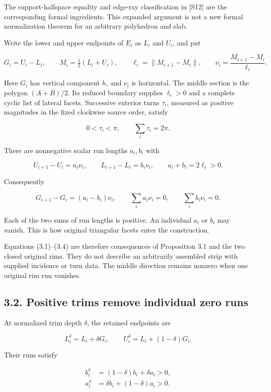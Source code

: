 \documentclass[
  11pt,
  letterpaper,
]{article}
\begin{document}
The support-halfspace equality and edge-ray classification in {[}S12{]}
are the corresponding formal ingredients. This expanded argument is not
a new formal normalization theorem for an arbitrary polyhedron and slab.

Write the lower and upper endpoints of \(E_i\) as \(L_i\) and \(U_i\),
and put

\[
G_i=U_i-L_i,\qquad
M_i=\tfrac12(L_i+U_i),\qquad
\ell_i=\|M_{i+1}-M_i\|,\qquad
\nu_i=\frac{M_{i+1}-M_i}{\ell_i}.
\tag{3.1}
\]

Here \(G_i\) has vertical component \(h\), and \(\nu_i\) is horizontal.
The middle section is the polygon \((A+B)/2\). Its reduced boundary
supplies \(\ell_i>0\) and a complete cyclic list of lateral facets.
Successive exterior turns \(\tau_i\), measured as positive magnitudes in
the fixed clockwise source order, satisfy

\[
0<\tau_i<\pi,\qquad \sum_i\tau_i=2\pi.
\tag{3.2}
\]

There are nonnegative scalar run lengths \(a_i,b_i\) with

\[
U_{i+1}-U_i=a_i\nu_i,\qquad
L_{i+1}-L_i=b_i\nu_i,\qquad
 a_i+b_i=2\ell_i>0.
\tag{3.3}
\]

Consequently

\[
G_{i+1}-G_i=(a_i-b_i)\nu_i,
\qquad
\sum_i a_i\nu_i=0,
\qquad
\sum_i b_i\nu_i=0.
\tag{3.4}
\]

Each of the two sums of run lengths is positive. An individual \(a_i\)
or \(b_i\) may vanish. This is how original triangular facets enter the
construction.

Equations (3.1)--(3.4) are therefore consequences of Proposition 3.1 and
the two closed original rims. They do not describe an arbitrarily
assembled strip with supplied incidence or turn data. The middle
direction remains nonzero when one original rim run vanishes.

\subsection{3.2. Positive trims remove individual zero
runs}\label{positive-trims-remove-individual-zero-runs}

At normalized trim depth \(\delta\), the retained endpoints are

\[
L_i^{\delta}=L_i+\delta G_i,
\qquad
U_i^{\delta}=L_i+(1-\delta)G_i.
\]

Their runs satisfy

\[
\begin{aligned}
b_i^{\delta}&=(1-\delta)b_i+\delta a_i>0,\\
a_i^{\delta}&=\delta b_i+(1-\delta)a_i>0.
\end{aligned}
\tag{3.5}
\]
\end{document}
